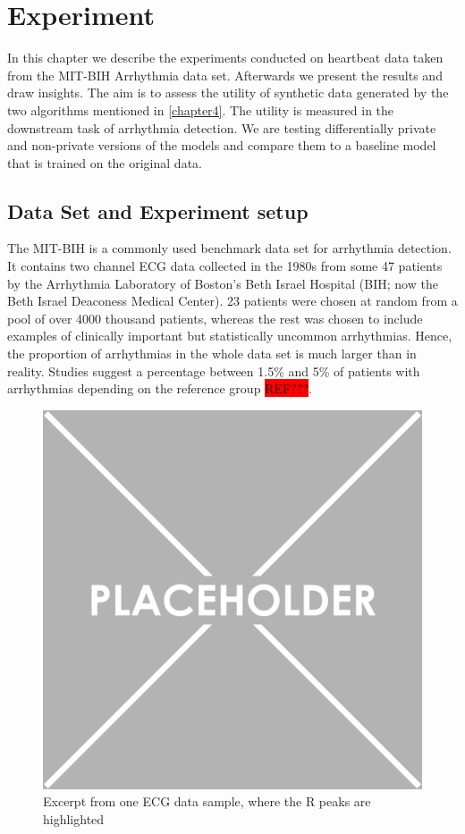 \section{Experiment}
In this chapter we describe the experiments conducted on heartbeat data taken from the MIT-BIH Arrhythmia data set. Afterwards we present the results and draw insights. The aim is to assess the utility of synthetic data generated by the two algorithms mentioned in \cref{chapter4}. The utility is measured in the downstream task of arrhythmia detection. We are testing differentially private and non-private versions of the models and compare them to a baseline model that is trained on the original data.

\subsection{Data Set and Experiment setup}
The MIT-BIH is a commonly used benchmark data set for arrhythmia detection. It contains two channel ECG data collected in the 1980s from some 47 patients by the Arrhythmia Laboratory of Boston's Beth Israel Hospital (BIH; now the Beth Israel Deaconess Medical Center). 23 patients were chosen at random from a pool of over 4000 thousand patients, whereas the rest was chosen to include examples of clinically important but statistically uncommon arrhythmias. Hence, the proportion of arrhythmias in the whole data set is much larger than in reality. Studies suggest a percentage between 1.5\% and 5\% of patients with arrhythmias depending on the reference group \colorbox{red}{REF???}. 

\begin{figure}[h]
    \centering
    \includegraphics[scale=0.5]{../images/placeholder.png}
    \caption{Excerpt from one ECG data sample, where the R peaks are highlighted}
\end{figure}

